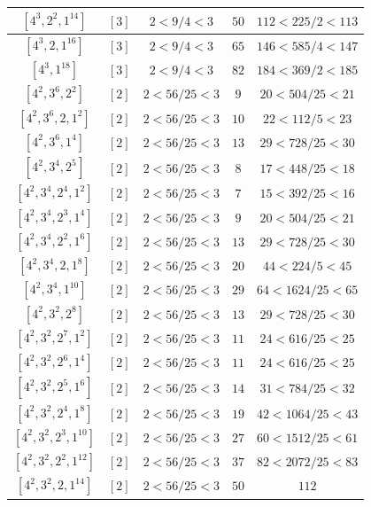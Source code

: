 \documentclass{article}%
\begin{document}
\begin{center}
\begin{longtable}{||c|c|c|c|c||}
$[4^{3}, 2^{2}, 1^{14}]$ & $[3]$ & $2 < 9/4 < 3$ & $50$ & $112 < 225/2 < 113$ \\ \hline 
$[4^{3}, 2, 1^{16}]$ & $[3]$ & $2 < 9/4 < 3$ & $65$ & $146 < 585/4 < 147$ \\ \hline 
$[4^{3}, 1^{18}]$ & $[3]$ & $2 < 9/4 < 3$ & $82$ & $184 < 369/2 < 185$ \\ \hline 
$[4^{2}, 3^{6}, 2^{2}]$ & $[2]$ & $2 < 56/25 < 3$ & $9$ & $20 < 504/25 < 21$ \\ \hline 
$[4^{2}, 3^{6}, 2, 1^{2}]$ & $[2]$ & $2 < 56/25 < 3$ & $10$ & $22 < 112/5 < 23$ \\ \hline 
$[4^{2}, 3^{6}, 1^{4}]$ & $[2]$ & $2 < 56/25 < 3$ & $13$ & $29 < 728/25 < 30$ \\ \hline 
$[4^{2}, 3^{4}, 2^{5}]$ & $[2]$ & $2 < 56/25 < 3$ & $8$ & $17 < 448/25 < 18$ \\ \hline 
$[4^{2}, 3^{4}, 2^{4}, 1^{2}]$ & $[2]$ & $2 < 56/25 < 3$ & $7$ & $15 < 392/25 < 16$ \\ \hline 
$[4^{2}, 3^{4}, 2^{3}, 1^{4}]$ & $[2]$ & $2 < 56/25 < 3$ & $9$ & $20 < 504/25 < 21$ \\ \hline 
$[4^{2}, 3^{4}, 2^{2}, 1^{6}]$ & $[2]$ & $2 < 56/25 < 3$ & $13$ & $29 < 728/25 < 30$ \\ \hline 
$[4^{2}, 3^{4}, 2, 1^{8}]$ & $[2]$ & $2 < 56/25 < 3$ & $20$ & $44 < 224/5 < 45$ \\ \hline 
$[4^{2}, 3^{4}, 1^{10}]$ & $[2]$ & $2 < 56/25 < 3$ & $29$ & $64 < 1624/25 < 65$ \\ \hline 
$[4^{2}, 3^{2}, 2^{8}]$ & $[2]$ & $2 < 56/25 < 3$ & $13$ & $29 < 728/25 < 30$ \\ \hline 
$[4^{2}, 3^{2}, 2^{7}, 1^{2}]$ & $[2]$ & $2 < 56/25 < 3$ & $11$ & $24 < 616/25 < 25$ \\ \hline 
$[4^{2}, 3^{2}, 2^{6}, 1^{4}]$ & $[2]$ & $2 < 56/25 < 3$ & $11$ & $24 < 616/25 < 25$ \\ \hline 
$[4^{2}, 3^{2}, 2^{5}, 1^{6}]$ & $[2]$ & $2 < 56/25 < 3$ & $14$ & $31 < 784/25 < 32$ \\ \hline 
$[4^{2}, 3^{2}, 2^{4}, 1^{8}]$ & $[2]$ & $2 < 56/25 < 3$ & $19$ & $42 < 1064/25 < 43$ \\ \hline 
$[4^{2}, 3^{2}, 2^{3}, 1^{10}]$ & $[2]$ & $2 < 56/25 < 3$ & $27$ & $60 < 1512/25 < 61$ \\ \hline 
$[4^{2}, 3^{2}, 2^{2}, 1^{12}]$ & $[2]$ & $2 < 56/25 < 3$ & $37$ & $82 < 2072/25 < 83$ \\ \hline 
$[4^{2}, 3^{2}, 2, 1^{14}]$ & $[2]$ & $2 < 56/25 < 3$ & $50$ & $112$ \\ \hline 

\end{longtable}
\end{center}
\end{document}
